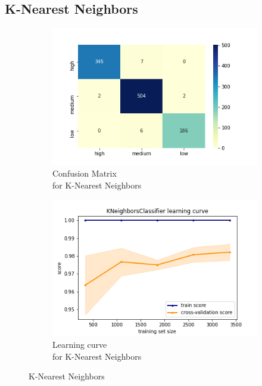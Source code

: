 \subsection{K-Nearest Neighbors}
\begin{figure}[h!]
     \captionsetup{justification=centering}             
     \centering
     \begin{subfigure}{0.49\textwidth}
         \centering
         \captionsetup{type=figure}
         \includegraphics[scale=0.45]{img/classification/knn_confusion.png}
         \caption{Confusion Matrix \\ for K-Nearest Neighbors}
         \label{fig:knn_confusion}
     \end{subfigure}
     \begin{subfigure}{0.49\textwidth}
         \centering
         \includegraphics[scale=0.45]{img/classification/knn_lc.png}
         \caption{Learning curve \\ for K-Nearest Neighbors}
         \label{fig:knn_lc}
     \end{subfigure}
     \caption{K-Nearest Neighbors}
    \label{fig:knn}
\end{figure}

